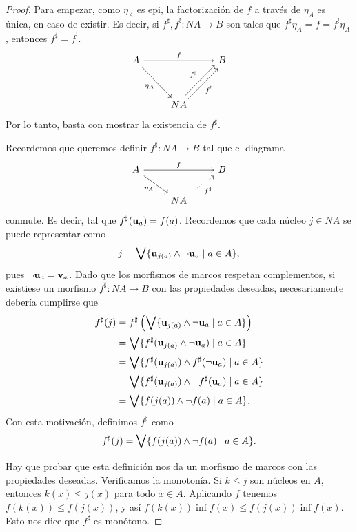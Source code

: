 \begin{proof}
  Para empezar, como $\eta_A$ es epi, la factorización de $f$ a
  través de $\eta_A$ es única, en caso de existir.
  Es decir, si $f^\sharp,f^!:NA\to B$ son tales que
  $f^\sharp\eta_A=f=f^!\eta_A$, entonces $f^\sharp=f^!$.
  \[
    \begin{tikzcd}
      A \ar[dr,"\eta_A"'] \ar[rr,"f"] && B \\[5mm]
      & NA \ar[ur,shift right,"f^!"'] \ar[ur,shift left,"f^\sharp"]
    \end{tikzcd}
  \]
  Por lo tanto, basta con mostrar la existencia de $f^\sharp$.
  
  Recordemos que queremos definir $f^\sharp:NA\to B$ tal que el
  diagrama 
  \[
    \begin{tikzcd}
      A \ar[dr,"\eta_A"'] \ar[rr,"f"] && B \\
      & NA \ar[ur,"f^\sharp"',dotted]
    \end{tikzcd}
  \]
  conmute.
  Es decir, tal que $f^\sharp(\mathbf u_{a}) = f(a)$.
  Recordemos que cada núcleo $j\in NA$ se puede representar como
  \[
    j = \bigvee\{\mathbf u_{j(a)} \wedge \neg \mathbf u_{a} \mid a\in A\}
  ,\]
  pues $\neg\mathbf u_{a} = \mathbf v_{a}$.
  Dado que los morfismos de marcos respetan complementos,
  si existiese un morfismo $f^\sharp:NA\to B$ con las propiedades
  deseadas, necesariamente debería cumplirse que
  \begin{align*}
    f^\sharp(j)
    &= f^\sharp\left(
      \bigvee\{\mathbf u_{j(a)}\wedge\neg\mathbf u_{a}\mid a\in A\}
      \right) \\
    &= \bigvee\{f^\sharp(\mathbf u_{j(a)}\wedge\neg\mathbf u_{a})\mid a\in A\} \\
    &= \bigvee\{f^\sharp(\mathbf u_{j(a)})\wedge f^\sharp(\neg\mathbf u_{a})
       \mid a\in A\} \\
    &= \bigvee\{f^\sharp(\mathbf u_{j(a)})\wedge \neg f^\sharp(\mathbf u_{a})
       \mid a\in A\} \\
    &= \bigvee\{f(j(a))\wedge \neg f(a) \mid a\in A\}.
  \end{align*}
  Con esta motivación, definimos $f^\sharp$ como
  \[
    f^\sharp(j) = \bigvee\{f(j(a))\wedge\neg f(a) \mid a\in A\}
  .\]
  
  Hay que probar que esta definición nos da un morfismo de marcos
  con las propiedades deseadas.
  Verificamos la monotonía.
  Si $k\leq j$ son núcleos en $A$, entonces $k(x)\leq j(x)$ para
  todo $x\in A$.
  Aplicando $f$ tenemos $f(k(x))\leq f(j(x))$, y así $f(k(x))\inf
  f(x)\leq f(j(x))\inf f(x)$.
  Esto nos dice que $f^\sharp$ es monótono.


\end{proof}
